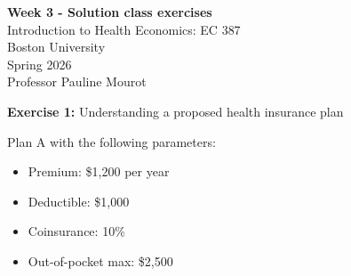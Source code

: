 \documentclass[12pt]{article}
\begin{document}
\begin{center}
\textbf{Week 3 - Solution class exercises} \\
Introduction to Health Economics: EC 387 \\
Boston University \\
Spring 2026 \\
Professor Pauline Mourot
\end{center}

\vspace{1em}

\textbf{Exercise 1:} Understanding a proposed health insurance plan

Plan A with the following parameters:
\begin{itemize}
    \item Premium: \$1,200 per year
    \item Deductible: \$1,000
    \item Coinsurance: 10\%
    \item Out-of-pocket max: \$2,500
\end{itemize}
\vspace{3mm}
\end{document}
